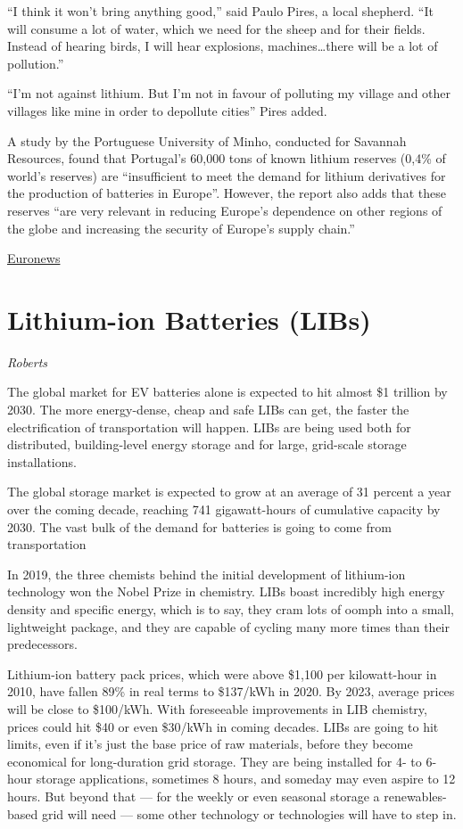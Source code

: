 \documentclass[
]{book}
\begin{document}
``I think it won't bring anything good,'' said Paulo Pires, a local shepherd. ``It will consume a lot of water, which we need for the sheep and for their fields. Instead of hearing birds, I will hear explosions, machines\ldots there will be a lot of pollution.''

``I'm not against lithium. But I'm not in favour of polluting my village and other villages like mine in order to depollute cities'' Pires added.

A study by the Portuguese University of Minho, conducted for Savannah Resources, found that Portugal's 60,000 tons of known lithium reserves (0,4\% of world's reserves) are ``insufficient to meet the demand for lithium derivatives for the production of batteries in Europe''. However, the report also adds that these reserves ``are very relevant in reducing Europe's dependence on other regions of the globe and increasing the security of Europe's supply chain.''

\href{https://www.euronews.com/2021/04/23/portuguese-village-suffers-the-high-cost-of-low-carbon-energy}{Euronews}

\hypertarget{lithium-ion-batteries-libs}{%
\section{Lithium-ion Batteries (LIBs)}\label{lithium-ion-batteries-libs}}

\emph{Roberts}

The global market for EV batteries alone is expected to hit almost \$1 trillion by 2030.
The more energy-dense, cheap and safe LIBs can get, the faster the electrification of transportation will happen.
LIBs are being used both for distributed, building-level energy storage and for large, grid-scale storage installations.

The global storage market is expected to grow at an average of 31 percent a year over the coming decade, reaching 741 gigawatt-hours of cumulative capacity by 2030.
The vast bulk of the demand for batteries is going to come from transportation

In 2019, the three chemists behind the initial development of lithium-ion technology won the Nobel Prize in chemistry. LIBs boast incredibly high energy density and specific energy, which is to say, they cram lots of oomph into a small, lightweight package, and they are capable of cycling many more times than their predecessors.

Lithium-ion battery pack prices, which were above \$1,100 per kilowatt-hour in 2010, have fallen 89\% in real terms to \$137/kWh in 2020. By 2023, average prices will be close to \$100/kWh.
With foreseeable improvements in LIB chemistry, prices could hit \$40 or even \$30/kWh in coming decades.
LIBs are going to hit limits, even if it's just the base price of raw materials, before they become economical for long-duration grid storage. They are being installed for 4- to 6-hour storage applications, sometimes 8 hours, and someday may even aspire to 12 hours. But beyond that --- for the weekly or even seasonal storage a renewables-based grid will need --- some other technology or technologies will have to step in.
\end{document}
